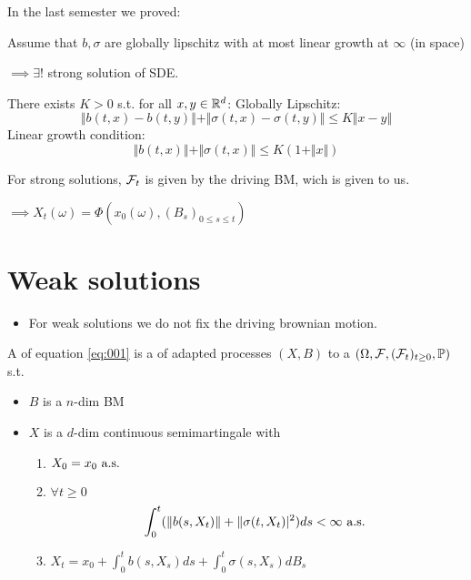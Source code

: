 In the last semester we proved:
\begin{theorem}\label{thm:existance_strong_solution}
    Assume that $b,\sigma$ are globally lipschitz 
    with at most linear growth at $\infty$ (in space)

    $\implies \exists!$ strong solution of SDE.
\end{theorem}

\begin{aremark}
    There exists $K>0$ s.t. for all $x,y\in\mathbb{R}^d$:
    Globally Lipschitz: 
    \[\Vert b(t,x)-b(t,y)\Vert+\Vert \sigma(t,x)-\sigma(t,y)\Vert\leq K\Vert x-y\Vert\]
    Linear growth condition:
    \[\Vert b(t,x)\Vert+\Vert \sigma(t,x)\Vert\leq K(1+\Vert x\Vert)\]
\end{aremark}

\begin{remark}
    For strong solutions, $\mathcal{F}_t$ is given by the driving BM, wich is given to us.

    $\implies X_t(\omega)=\Phi(x_0(\omega),(B_s)_{0\leq s\leq t})$ 
\end{remark}

\section{Weak solutions}

\begin{itemize}
    \item For weak solutions we do not fix the driving brownian motion.
\end{itemize}

\begin{definition}\label{def:weak_solution}
    A  of equation \ref{eq:001} is a  of adapted processes 
    $(X,B)$ to a $(\Omega,\mathcal{F},(\mathcal{F}_t)_{t\geq 0},\mathbb{P})$ s.t.\begin{itemize}
        \item $B$ is a $n$-dim BM 
        \item $X$ is a $d$-dim continuous semimartingale with \begin{enumerate}
            \item $X_0=x_0\text{ a.s. }$
            \item $\forall t\geq 0$\[\int_0^t(\Vert b(s,X_t)\Vert+\Vert \sigma(t,X_t)\vert^2)ds <\infty \text{ a.s. }\]
            \item $X_t=x_0+\int_0^t b(s,X_s)ds+\int_0^t\sigma(s,X_s)dB_s$
        \end{enumerate}
    \end{itemize}
\end{definition}


